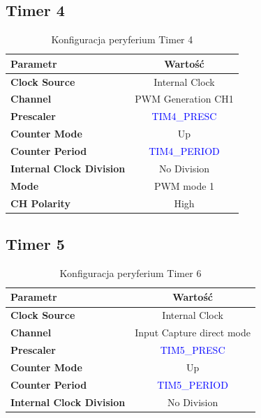 \documentclass[10pt, a4paper]{article}
\begin{document}
\subsection{Timer 4}

\begin{table}[H]
	\centering
	\begin{tabular}{|l|c|} \hline
		\textbf{Parametr} & Wartość \\
		\hline
		\hline  \textbf{Clock Source}&Internal Clock  \\\hline
		\textbf{Channel} & PWM Generation CH1\\\hline
		\textbf{Prescaler} & \textcolor{blue}{TIM4\_PRESC}\\\hline
		\textbf{Counter Mode} &  Up\\
		\hline
		\textbf{Counter Period}& \textcolor{blue}{TIM4\_PERIOD}\\\hline
		\textbf{Internal Clock Division}& No Division\\
		\hline
		\textbf{Mode}& PWM mode 1\\
		\hline
		\textbf{CH Polarity}& High\\
		\hline
	\end{tabular}
	\caption{Konfiguracja peryferium Timer 4}
	\label{tab:Timer4}
\end{table}

\subsection{Timer 5}

\begin{table}[H]
	\centering
	\begin{tabular}{|l|c|} \hline
		\textbf{Parametr} & Wartość \\
		\hline
		\hline  \textbf{Clock Source}&Internal Clock  \\\hline
		\textbf{Channel} & Input Capture direct mode\\\hline
		\textbf{Prescaler} & \textcolor{blue}{TIM5\_PRESC}\\\hline
		\textbf{Counter Mode} &  Up\\
		\hline
		\textbf{Counter Period}& \textcolor{blue}{TIM5\_PERIOD}\\\hline
		\textbf{Internal Clock Division}& No Division\\
		\hline
	\end{tabular}
	\caption{Konfiguracja peryferium Timer 6}
	\label{tab:Timer6}
\end{table}
\end{document}
